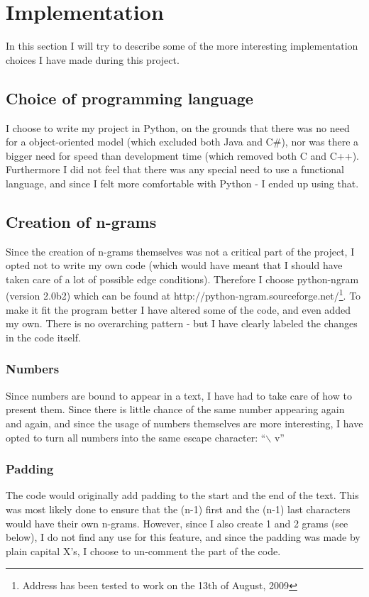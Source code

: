 \section{Implementation}
\label{implementation}

In this section I will try to describe some of the more interesting implementation choices I have made during this project.

\subsection{Choice of programming language}
I choose to write my project in Python, on the grounds that there was no need for a object-oriented model (which excluded both Java and C\#), nor was there a bigger need for speed than development time (which removed both C and C++). Furthermore I did not feel that there was any special need to use a functional language, and since I felt more comfortable with Python - I ended up using that.

\subsection{Creation of n-grams}
Since the creation of n-grams themselves was not a critical part of the project, I opted not to write my own code (which would have meant that I should have taken care of a lot of possible edge conditions). Therefore I choose python-ngram (version 2.0b2) which can be found at http://python-ngram.sourceforge.net/\footnote{Address has been tested to work on the 13th of August, 2009}. To make it fit the program better I have altered some of the code, and even added my own. There is no overarching pattern - but I have clearly labeled the changes in the code itself.
\subsubsection*{Numbers}
Since numbers are bound to appear in a text, I have had to take care of how to present them. Since there is little chance of the same number appearing again and again, and since the usage of numbers themselves are more interesting, I have opted to turn all numbers into the same escape character: ``$\backslash$ v''
\subsubsection*{Padding}
The code would originally add padding to the start and the end of the text. This was most likely done to ensure that the (n-1) first and the (n-1) last characters would have their own n-grams. However, since I also create 1 and 2 grams (see below), I do not find any use for this feature, and since the padding was made by plain capital X's, I choose to un-comment the part of the code.

